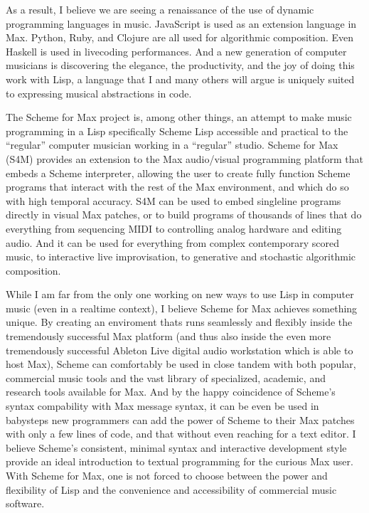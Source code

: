 \documentclass[letterpaper,10pt,english]{sphinxmanual}
\begin{document}
\sphinxAtStartPar
As a result, I believe we are seeing a renaissance of the use of dynamic programming languages in music.
JavaScript is used as an extension language in Max.
Python, Ruby, and Clojure are all used for algorithmic composition.
Even Haskell is used in live\sphinxhyphen{}coding performances. And a new generation of computer
musicians is discovering the elegance, the productivity, and the joy of doing this work
with Lisp, a language that I and many others will argue is uniquely suited to expressing musical
abstractions in code.

\sphinxAtStartPar
The Scheme for Max project is, among other things, an attempt to make music programming in a Lisp
\sphinxhyphen{} specifically Scheme Lisp \sphinxhyphen{} accessible and practical to the “regular” computer musician working in a “regular” studio.
Scheme for Max (S4M) provides an extension to the Max audio/visual programming platform
that embeds a Scheme interpreter, allowing the user to create fully function Scheme programs that
interact with the rest of the Max environment, and which do so with high temporal accuracy.
S4M can be used to embed single\sphinxhyphen{}line programs directly in visual Max patches, or to build
programs of thousands of lines that do everything from sequencing MIDI
to controlling analog hardware and editing audio.
And it can be used for everything from complex contemporary scored music, to interactive
live improvisation, to generative and stochastic algorithmic composition.

\sphinxAtStartPar
While I am far from the only one working on new ways to use Lisp in computer music (even in a realtime context),
I believe Scheme for Max achieves something unique.
By creating an enviroment thats runs seamlessly and flexibly inside the tremendously successful
Max platform (and thus also inside the even more tremendously successful Ableton Live digital audio workstation
which is able to host Max),
Scheme can comfortably be used in close tandem with both popular,
commercial music tools and the vast library of specialized, academic, and research tools available for Max.
And by the happy coincidence of Scheme’s syntax compability with Max message syntax, it can be even be used
in baby\sphinxhyphen{}steps \sphinxhyphen{} new programmers can add the power of Scheme to their Max patches with
only a few lines of code, and that without even reaching for a text editor.
I believe Scheme’s consistent, minimal syntax and interactive development style provide an ideal
introduction to textual programming for the curious Max user.
With Scheme for Max, one is not forced to choose between the power and flexibility of Lisp and the
convenience and accessibility of commercial music software.
\end{document}
